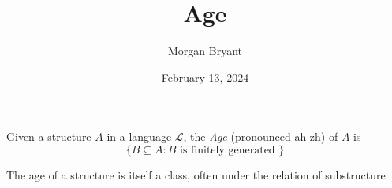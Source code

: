 \documentclass[a4paper]{article}
\title{Age}
\date{February 13, 2024}
\author{Morgan Bryant}
\begin{document}
\maketitle
\par{Given a structure \(A\) in a language \(\mathcal {L}\), the \emph{Age} (pronounced ah-zh) of \(A\) is \[\{ B \subseteq  A: B  \text { is finitely generated } \}\]}\par{The age of a structure is itself a class, often under the relation of substructure}
\printbibliography
\end{document}
